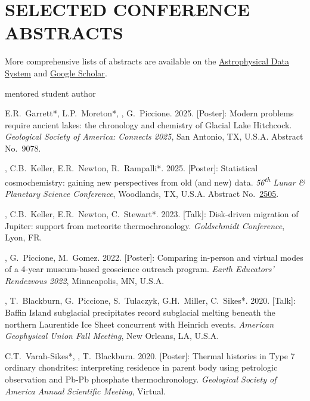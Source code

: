 \section{SELECTED CONFERENCE ABSTRACTS}

More comprehensive lists of abstracts are available on the \href{https://ui.adsabs.harvard.edu/search/q=author%3A%22Edwards%2C%20Graham%20Harper%22}{Astrophysical Data System} and \href{https://scholar.google.com/citations?user=KHLOvgcAAAAJ&hl=en}{Google Scholar}.

\hfill* mentored student author

\begin{etaremune} [itemsep=4pt, leftmargin=3ex]
  
  \item E.R.~Garrett*, L.P.~Moreton*, \ghedwards, G.~Piccione. 2025. [Poster]: Modern problems require ancient lakes: the chronology and chemistry of Glacial Lake Hitchcock. \textit{Geological Society of America: Connects 2025}, San Antonio, TX, U.S.A. Abstract No.~9078.

  \item \ghedwards, C.B.~Keller, E.R.~Newton, R.~Rampalli*. 2025. [Poster]: Statistical cosmochemistry: gaining new perspectives from old (and new) data. \textit{56\textsuperscript{th} Lunar \& Planetary Science Conference}, Woodlands, TX, U.S.A. Abstract No.~\href{https://www.hou.usra.edu/meetings/lpsc2025/pdf/2505.pdf}{2505}.

  \item \ghedwards, C.B.~Keller, E.R.~Newton, C.~Stewart*. 2023. [Talk]: Disk-driven migration of Jupiter: support from meteorite thermochronology. \textit{Goldschmidt Conference}, Lyon, FR. 

  \item \ghedwards, G.~Piccione, M.~Gomez. 2022. [Poster]: Comparing in-person and virtual modes of a 4-year museum-based geoscience outreach program. \textit{Earth Educators' Rendezvous 2022}, Minneapolis, MN, U.S.A.

  \item \ghedwards, T.~Blackburn, G.~Piccione, S.~Tulaczyk, G.H.~Miller, C.~Sikes*. 2020. [Talk]: Baffin Island subglacial precipitates record subglacial melting beneath the northern Laurentide Ice Sheet concurrent with Heinrich events. \textit{American Geophysical Union Fall Meeting}, New Orleans, LA, U.S.A.

  \item C.T.~Varah-Sikes*, \ghedwards, T.~Blackburn. 2020. [Poster]: Thermal histories in Type 7 ordinary chondrites: interpreting residence in parent body using petrologic observation and Pb-Pb phosphate thermochronology. \textit{Geological Society of America Annual Scientific Meeting}, Virtual.


\end{etaremune}
